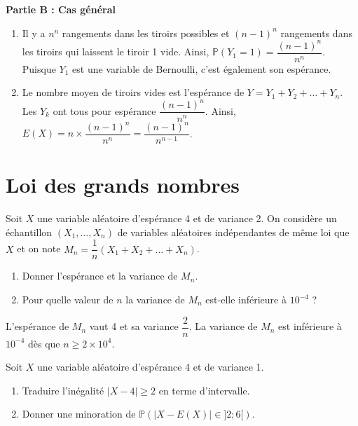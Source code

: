 \documentclass[11pt,fleqn, openany]{book} %
\begin{document}
\begin{solution}
\textbf{Partie B : Cas général}

\begin{enumerate}
\item Il y a $n^n$ rangements dans les tiroirs possibles et $(n-1)^n$ rangements dans les tiroirs qui laissent le tiroir 1 vide. Ainsi, $\mathbb{P}(Y_1=1)=\dfrac{(n-1)^n}{n^n}$. Puisque $Y_1$ est une variable de Bernoulli, c'est également son espérance.
\item Le nombre moyen de tiroirs vides est l'espérance de $Y=Y_1+Y_2+\ldots + Y_n$. Les $Y_k$ ont tous pour espérance $\dfrac{(n-1)^n}{n^n}$. Ainsi, $E(X)=n \times \dfrac{(n-1)^n}{n^n}=\dfrac{(n-1)^n}{n^{n-1}}$.
\end{enumerate}

\end{solution}


\section*{Loi des grands nombres}


\begin{exercise}[topic=lgn03]Soit $X$ une variable aléatoire d'espérance 4 et de variance 2. On considère un échantillon $(X_1, \ldots, X_n)$ de variables aléatoires indépendantes de même loi que $X$ et on note $M_n = \dfrac{1}{n} (X_1+X_2+\ldots + X_n)$.
\begin{enumerate}
\item Donner l'espérance et la variance de $M_n$.
\item Pour quelle valeur de $n$ la variance de $M_n$ est-elle inférieure à $10^{-4}$ ?
\end{enumerate}
\end{exercise}

\begin{solution}L'espérance de $M_n$ vaut 4 et sa variance $\dfrac{2}{n}$.
La variance de $M_n$ est inférieure à $10^{-4}$ dès que $n\geqslant 2 \times 10^{4}$.\end{solution}



\begin{exercise}[topic=lgn03]Soit $X$ une variable aléatoire d'espérance 4 et de variance 1. 
\begin{enumerate}
\item Traduire l'inégalité $|X-4|\geqslant 2$ en terme d'intervalle.
\item Donner une minoration de $\mathbb{P}(|X-E(X)| \in ]2;6[)$.
\end{enumerate}
\end{exercise}
\end{document}
